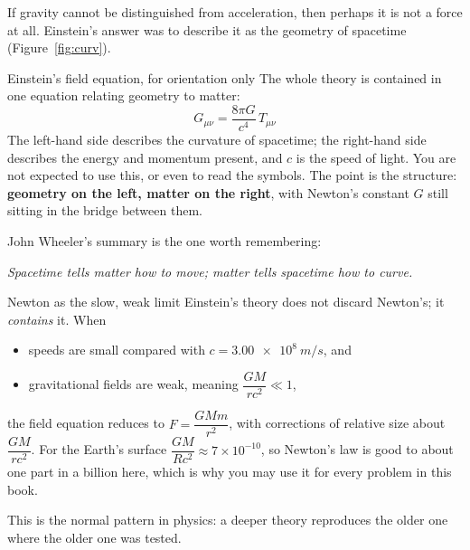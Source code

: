 If gravity cannot be distinguished from acceleration, then perhaps it is not a force at all. Einstein's answer was
to describe it as the geometry of spacetime (Figure~\ref{fig:curv}).

\begin{figure}[htbp]
\centering
{}
\end{figure}

\begin{remarkbox}{Einstein's field equation, for orientation only}
The whole theory is contained in one equation relating geometry to matter:
\[
G_{\mu\nu}=\frac{8\pi G}{c^{4}}\,T_{\mu\nu}
\]
The left-hand side describes the curvature of spacetime; the right-hand side describes the energy and
momentum present, and $c$ is the speed of light. You are not expected to use this, or even to read the symbols. The point is the
structure: \textbf{geometry on the left, matter on the right}, with Newton's constant $G$ still sitting
in the bridge between them.

\smallskip
John Wheeler's summary is the one worth remembering:
\begin{center}
\emph{Spacetime tells matter how to move; matter tells spacetime how to curve.}
\end{center}
\end{remarkbox}

\begin{remarkbox}{Newton as the slow, weak limit}
Einstein's theory does not discard Newton's; it \emph{contains} it. When
\begin{itemize}
\item speeds are small compared with $c=\SI{3.00e8}{m/s}$, and
\item gravitational fields are weak, meaning $\dfrac{GM}{rc^{2}}\ll1$,
\end{itemize}
the field equation reduces to $F=\dfrac{GMm}{r^{2}}$, with corrections of relative size about
$\dfrac{GM}{rc^{2}}$. For the Earth's surface $\dfrac{GM}{Rc^{2}}\approx7\times10^{-10}$, so Newton's law
is good to about one part in a billion here, which is why you may use it for every problem in this book.

\smallskip
This is the normal pattern in physics: a deeper theory reproduces the older one where the older one was
tested.
\end{remarkbox}


